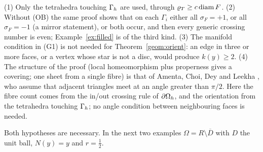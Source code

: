 \begin{remark}\label{geom:rem}
(1) Only the tetrahedra touching $\Gamma_h$ are used, through $\varrho_T\ge c\operatorname{diam} F$. (2) Without (OB) the same proof shows that on each $\Gamma_i$ either all $\sigma_F=+1$, or all $\sigma_F=-1$ (a mirror statement), or both occur, and then every generic crossing number is even; Example~\ref{ex:filled} is of the third kind. (3) The manifold condition in (G1) is not needed for Theorem~\ref{geom:orient}: an edge in three or more faces, or a vertex whose star is not a disc, would produce $k(y)\ge2$. (4) The structure of the proof (local homeomorphism plus properness gives a covering; one sheet from a single fibre) is that of Amenta, Choi, Dey and Leekha \cite[Theorem~15]{AmentaChoiDeyLeekha2000}, who assume that adjacent triangles meet at an angle greater than $\pi/2$. Here the fibre count comes from the in/out crossing rule of $\partial\Omega_h$, and the orientation from the tetrahedra touching $\Gamma_h$; no angle condition between neighbouring faces is needed.
\end{remark}

Both hypotheses are necessary. In the next two examples $\Omega=R\setminus\overline D$ with $D$ the unit ball, $N(y)=y$ and $r=\frac12$.


